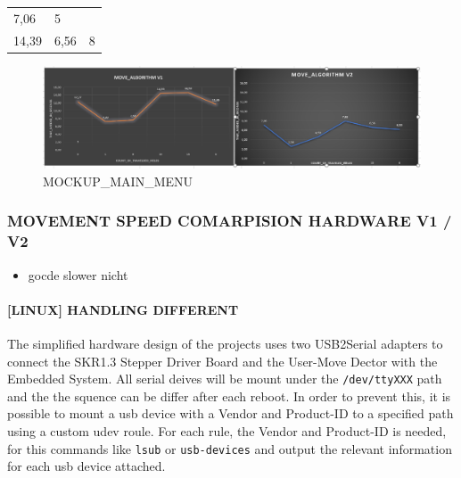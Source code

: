 \documentclass[
  english,
  paper=a4,
  ,captions=tableheading
]{scrartcl}
\newcommand{\passthrough}[1]{#1}
\providecommand{\tightlist}{%
  \setlength{\itemsep}{0pt}\setlength{\parskip}{0pt}}
\begin{document}
\begin{longtable}[]{@{}lll@{}}
\begin{minipage}[t]{0.29\columnwidth}
7,06\strut
\end{minipage} & \begin{minipage}[t]{0.34\columnwidth}\raggedright
5\strut
\end{minipage}\tabularnewline
\begin{minipage}[t]{0.29\columnwidth}\raggedright
14,39\strut
\end{minipage} & \begin{minipage}[t]{0.29\columnwidth}\raggedright
6,56\strut
\end{minipage} & \begin{minipage}[t]{0.34\columnwidth}\raggedright
8\strut
\end{minipage}\tabularnewline
\bottomrule
\end{longtable}

\begin{figure}
\centering
\includegraphics{./images/FigureMovementTims_GRAPH_COMP.PNG}
\caption{MOCKUP\_MAIN\_MENU}
\end{figure}

\hypertarget{movement-speed-comarpision-hardware-v1-v2}{%
\subsubsection{MOVEMENT SPEED COMARPISION HARDWARE V1 /
V2}\label{movement-speed-comarpision-hardware-v1-v2}}

\begin{itemize}
\tightlist
\item
  gocde slower nicht
\end{itemize}

\hypertarget{linux-handling-different}{%
\paragraph{{[}LINUX{]} HANDLING
DIFFERENT}\label{linux-handling-different}}

The simplified hardware design of the projects uses two USB2Serial
adapters to connect the SKR1.3 Stepper Driver Board and the User-Move
Dector with the Embedded System. All serial deives will be mount under
the \passthrough{\lstinline!/dev/ttyXXX!} path and the the squence can
be differ after each reboot. In order to prevent this, it is possible to
mount a usb device with a Vendor and Product-ID to a specified path
using a custom udev roule. For each rule, the Vendor and Product-ID is
needed, for this commands like \passthrough{\lstinline!lsub!} or
\passthrough{\lstinline!usb-devices!} and output the relevant
information for each usb device attached.
\end{document}
